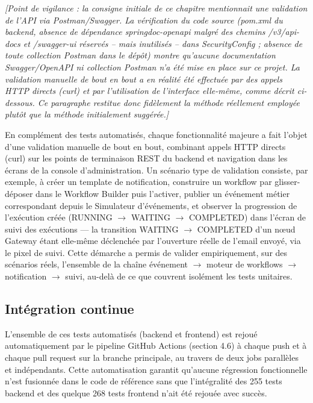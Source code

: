 \documentclass[12pt,a4paper]{report}
\newcommand{\placeholder}[1]{\par\smallskip\noindent\textcolor{placeholderred}{\itshape [#1]}\par\smallskip}
\begin{document}
\placeholder{Point de vigilance : la consigne initiale de ce chapitre mentionnait une validation de l'API via Postman/Swagger. La vérification du code source (pom.xml du backend, absence de dépendance springdoc-openapi malgré des chemins /v3/api-docs et /swagger-ui réservés -- mais inutilisés -- dans SecurityConfig ; absence de toute collection Postman dans le dépôt) montre qu'aucune documentation Swagger/OpenAPI ni collection Postman n'a été mise en place sur ce projet. La validation manuelle de bout en bout a en réalité été effectuée par des appels HTTP directs (curl) et par l'utilisation de l'interface elle-même, comme décrit ci-dessous. Ce paragraphe restitue donc fidèlement la méthode réellement employée plutôt que la méthode initialement suggérée.}

En complément des tests automatisés, chaque fonctionnalité majeure a fait l'objet d'une validation manuelle de bout en bout, combinant appels HTTP directs (curl) sur les points de terminaison REST du backend et navigation dans les écrans de la console d'administration. Un scénario type de validation consiste, par exemple, à créer un template de notification, construire un workflow par glisser-déposer dans le Workflow Builder puis l'activer, publier un événement métier correspondant depuis le Simulateur d'événements, et observer la progression de l'exécution créée (RUNNING $\rightarrow$ WAITING $\rightarrow$ COMPLETED) dans l'écran de suivi des exécutions --- la transition WAITING $\rightarrow$ COMPLETED d'un n\oe ud Gateway étant elle-même déclenchée par l'ouverture réelle de l'email envoyé, via le pixel de suivi. Cette démarche a permis de valider empiriquement, sur des scénarios réels, l'ensemble de la chaîne événement $\rightarrow$ moteur de workflows $\rightarrow$ notification $\rightarrow$ suivi, au-delà de ce que couvrent isolément les tests unitaires.

\subsection{Intégration continue}

L'ensemble de ces tests automatisés (backend et frontend) est rejoué automatiquement par le pipeline GitHub Actions (section 4.6) à chaque push et à chaque pull request sur la branche principale, au travers de deux jobs parallèles et indépendants. Cette automatisation garantit qu'aucune régression fonctionnelle n'est fusionnée dans le code de référence sans que l'intégralité des 255 tests backend et des quelque 268 tests frontend n'ait été rejouée avec succès.
\end{document}
